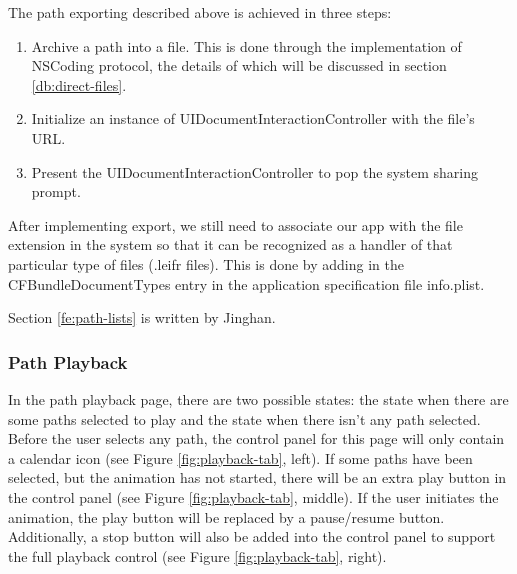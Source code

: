 \documentclass[12pt,a4paper]{article}
\renewcommand\texttt[1]{{\ttfamily\color{textttColor}#1}}
\begin{document}
            The path exporting described above is achieved in three steps: 
            
            \begin{enumerate}
                \item Archive a path into a file. This is done through the implementation of \texttt{NSCoding} protocol, the details of which will be discussed in section \ref{db:direct-files}.
                \item Initialize an instance of \texttt{UIDocumentInteractionController} with the file's URL.
                \item Present the \texttt{UIDocumentInteractionController} to pop the system sharing prompt.
            \end{enumerate}
            
            After implementing export, we still need to associate our app with the file extension in the system so that it can be recognized as a handler of that particular type of files (\texttt{.leifr} files). This is done by adding in the \texttt{CFBundleDocumentTypes} entry in the application specification file \texttt{info.plist}.
            
            \footnotesize
            Section \ref{fe:path-lists} is written by Jinghan.
            \normalsize
            
            \subsubsection{Path Playback} %
                \label{fe:path-playback}
                In the path playback page, there are two possible states: the state when there are some paths selected to play and the state when there isn't any path selected. Before the user selects any path, the control panel for this page will only contain a calendar icon (see Figure \ref{fig:playback-tab}, left). If some paths have been selected, but the animation has not started, there will be an extra play button in the control panel (see Figure \ref{fig:playback-tab}, middle). If the user initiates the animation, the play button will be replaced by a pause/resume button. Additionally, a stop button will also be added into the control panel to support the full playback control (see Figure \ref{fig:playback-tab}, right).
                
\end{document}
